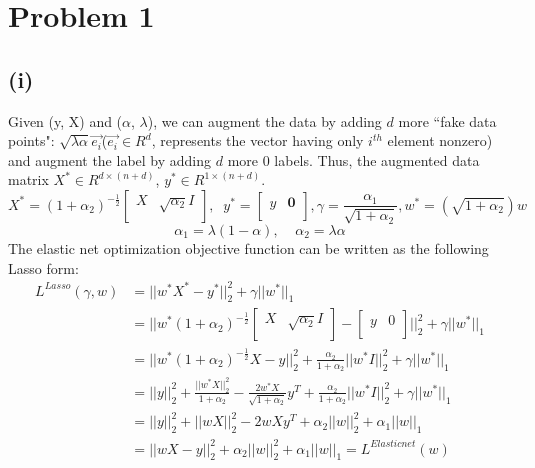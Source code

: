 \documentclass[]{homework}
\begin{document}
\maketitle

\section*{Problem 1}

\subsection*{(i)}Given (y, X) and ($\alpha$, $\lambda$), we can augment the data by adding $d$ more ``fake data points": $\sqrt{\lambda \alpha}\Vec{e_i}$($\Vec{e_i} \in R^d$, represents the vector having only $i^{th}$ element nonzero) and augment the label by adding $d$ more 0 labels. Thus, the augmented data matrix $X^* \in R^{d \times (n+d)}$, $y^* \in R^{1 \times (n+d)}$.
\begin{equation}
X^*= (1+\alpha_2)^{-\frac{1}{2}} \begin{bmatrix}
   X & \sqrt{\alpha_2}I\\
  \end{bmatrix},\;\;y^*=\begin{bmatrix}
   y& \mathbf{0}\\
  \end{bmatrix}, \gamma = \frac{\alpha_1}{\sqrt{1+\alpha_2}}, w^*= (\sqrt{1+\alpha_2})w
\end{equation}
\begin{equation}
\alpha_1 = \lambda (1-\alpha), \;\;\;\; \alpha_2 = \lambda \alpha
\end{equation}
The elastic net optimization objective function can be written as the following Lasso form\cite{hastieElasticNet}:
\begin{equation}
\begin{aligned}
L^{Lasso}(\gamma, w)&=||w^*X^*-y^*||_2^2+\gamma ||w^*||_1 \\&
=|| w^*(1+\alpha_2)^{-\frac{1}{2}} \begin{bmatrix}
   X & \sqrt{\alpha_2}I\\
  \end{bmatrix}- \begin{bmatrix}
   y& 0\\\end{bmatrix}||_2^2+\gamma ||w ^*||_1\\&
  = || w^*(1+\alpha_2)^{-\frac{1}{2}}X - y||_2^2+\frac{\alpha_2}{1+\alpha_2}||w^* I||_2^2 +\gamma ||w^*||_1\\&=
  ||y||_2^2 + \frac{||w^* X||_2^2}{1+\alpha_2} - \frac{2w^*X}{\sqrt{1+\alpha_2}}y^T+\frac{\alpha_2}{1+\alpha_2}||w^* I||_2^2 +\gamma ||w^*||_1\\&=
  ||y||_2^2 +  ||wX||_2^2 - 2wX y^T+\alpha_2 ||w||_2^2 + \alpha_1 ||w||_1\\&=
  ||wX-y||_2^2+\alpha_2||w||_2^2 + \alpha_1 ||w||_1 =L^{Elasticnet}(w)
\end{aligned}
\end{equation}
\end{document}
